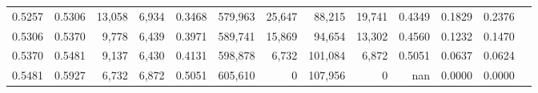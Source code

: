 \begin{tabular}{rrrrrrrrrrrrr}
0.5257 & 0.5306 &  13,058 & 6,934 &                                     0.3468 & 579,963 &  25,647 &  88,215 &  19,741 & 0.4349 & 0.1829 & 0.2376 \\
0.5306 & 0.5370 &   9,778 & 6,439 &                                     0.3971 & 589,741 &  15,869 &  94,654 &  13,302 & 0.4560 & 0.1232 & 0.1470 \\
0.5370 & 0.5481 &   9,137 & 6,430 &                                     0.4131 & 598,878 &   6,732 & 101,084 &   6,872 & 0.5051 & 0.0637 & 0.0624 \\
0.5481 & 0.5927 &   6,732 & 6,872 &                                     0.5051 & 605,610 &       0 & 107,956 &       0 &    nan & 0.0000 & 0.0000 \\
\bottomrule
\end{tabular}

